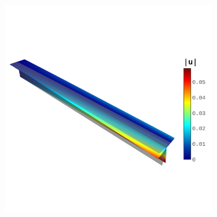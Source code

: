 \begin{figure}[h]
	\center
	\begin{subfigure}[b]{0.43\textwidth}
		\centering
		\caption{}\label{fig:T-beam-config}
	\end{subfigure}
	\begin{subfigure}[b]{0.54\textwidth}
		\centering
		\includegraphics[width = \textwidth,trim={0cm 4cm 0cm 1cm},clip]{t-beam_deform}

\end{subfigure}
\end{figure}
